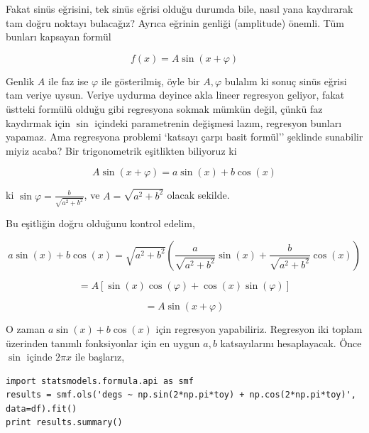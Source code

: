 \documentclass[12pt,fleqn]{article}\usepackage{../../common}
\begin{document}
Fakat sinüs eğrisini, tek sinüs eğrisi olduğu durumda bile, nasıl yana
kaydırarak tam doğru noktayı bulacağız? Ayrıca eğrinin genliği (amplitude)
önemli. Tüm bunları kapsayan formül

$$ f(x) = A \sin (x+\varphi) $$

Genlik $A$ ile faz ise $\varphi$ ile gösterilmiş, öyle bir $A,\varphi$ bulalım
ki sonuç sinüs eğrisi tam veriye uysun. Veriye uydurma deyince akla lineer
regresyon geliyor, fakat üstteki formülü olduğu gibi regresyona sokmak mümkün
değil, çünkü faz kaydırmak için $\sin$ içindeki parametrenin değişmesi lazım,
regresyon bunları yapamaz. Ama regresyona problemi `katsayı çarpı basit formül''
şeklinde sunabilir miyiz acaba? Bir trigonometrik eşitlikten biliyoruz ki

$$  A \sin (x+\varphi) = a\sin(x) + b\cos(x) $$

ki $\sin\varphi = \frac{b}{\sqrt{a^2+b^2}}$, ve $A = \sqrt{a^2+b^2}$ olacak  sekilde. 

Bu eşitliğin doğru olduğunu kontrol edelim,

$$ a \sin(x) + b \cos(x) = \sqrt{a^2+b^2} \left(\frac{a}{\sqrt{a^2+b^2}} \sin(x) + \frac{b}{\sqrt{a^2+b^2}} \cos(x)\right) $$

$$  = A\left[\sin(x)\cos(\varphi) + \cos(x)\sin(\varphi)\right] $$

$$ = A\sin(x+\varphi) $$

O zaman $a \sin(x) + b \cos(x)$ için regresyon yapabiliriz. Regresyon iki toplam
üzerinden tanımlı fonksiyonlar için en uygun $a,b$ katsayılarını
hesaplayacak. Önce $\sin$ içinde $2\pi x$ ile başlarız, 

\begin{verbatim}
import statsmodels.formula.api as smf
results = smf.ols('degs ~ np.sin(2*np.pi*toy) + np.cos(2*np.pi*toy)', data=df).fit()
print results.summary()
\end{verbatim}
\end{document}
